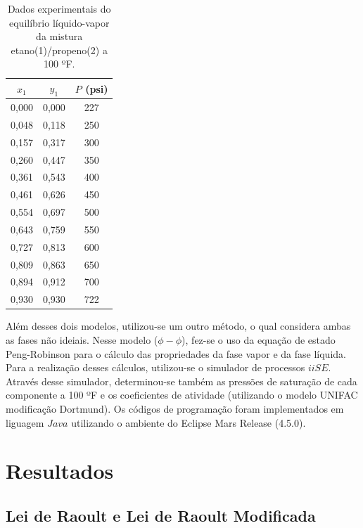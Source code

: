 \begin{table}[h]
\renewcommand{\arraystretch}{1.3}
\caption{Dados experimentais do equilíbrio líquido-vapor da mistura
etano(1)/propeno(2) a 100 ºF.}
\footnotesize
\center
\begin{tabular}{SSS[table-format=4.1,round-mode=places,round-precision=0]}
\toprule
   {$x_1$} & {$y_1$}& {$P$ (psi)} \\
,000 & 0,000 & 227 \\
  0,048 & 0,118 & 250 \\
  0,157 & 0,317 & 300 \\
  0,260 & 0,447 & 350 \\
  0,361 & 0,543 & 400 \\
  0,461 & 0,626 & 450 \\
  0,554 & 0,697 & 500 \\
  0,643 & 0,759 & 550 \\
  0,727 & 0,813 & 600 \\
  0,809 & 0,863 & 650 \\
  0,894 & 0,912 & 700 \\
  0,930 & 0,930 & 722 \\
\bottomrule
\end{tabular}
\label{tab:dadosexp}
\end{table}

Além desses dois modelos, utilizou-se um outro método, o qual considera ambas as
fases não ideiais. Nesse modelo ($\phi-\phi$), fez-se o uso da equação de
estado Peng-Robinson para o cálculo das propriedades da fase vapor e da fase
líquida.
Para a realização desses cálculos, utilizou-se o simulador de processos $iiSE$. Através
desse simulador, determinou-se também as pressões de saturação de cada
componente a 100 ºF e os coeficientes de atividade (utilizando o modelo UNIFAC modificação Dortmund). Os códigos de programação foram implementados em
liguagem $Java$ utilizando o ambiente do Eclipse Mars Release (4.5.0).


\section{Resultados}



\subsection{Lei de Raoult e Lei de Raoult Modificada}

